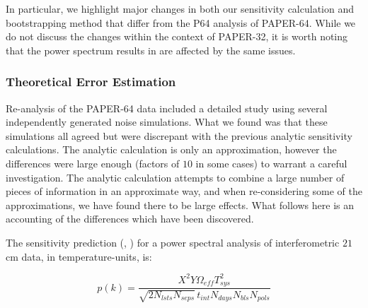 \documentclass[preprint2,numberedappendix,tighten]{aastex6}  %
\begin{document}
In particular, we highlight major changes in both our sensitivity calculation and bootstrapping method that differ from the P64 
analysis of PAPER-64. While we do not discuss the changes within the context of PAPER-32, it is worth noting that the power 
spectrum results in \citet{parsons_et_al2014} are affected by the same issues.

\subsubsection{Theoretical Error Estimation}
\label{sec:PSSense}

Re-analysis of the PAPER-64 data included a detailed study using several independently generated noise simulations. What we 
found was that these simulations all agreed but were discrepant with the previous analytic sensitivity calculations. The analytic 
calculation is only an approximation, however the differences were large enough (factors of $10$ in some cases) to warrant a 
careful investigation. The analytic calculation attempts to combine a large number of pieces of information in an approximate 
way, and when re-considering some of the approximations, we have found there to be large effects. What follows here is an 
accounting of the differences which have been discovered.

The sensitivity prediction (\citealt{parsons_et_al2012a}, \citealt{pober_et_al2013}) for a power spectral analysis of 
interferometric $21$ cm data, in temperature-units, is:

\begin{equation}
\label{eq:sense}
p(k) = \frac{X^{2}Y \Omega_{eff} T_{sys}^{2}}{\sqrt{2N_{lsts}N_{seps}}\,t_{int}N_{days}N_{bls}N_{pols}}
\end{equation}
\end{document}
